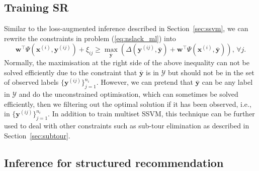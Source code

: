 \subsection{Training SR}
\label{ssec:SRtrain}


Similar to the loss-augmented inference described in Section~\ref{sec:ssvm}, 
we can rewrite the constraints in problem (\ref{eq:nslack_ml}) into
\begin{equation*}
\mathbf{w}^\top \Psi(\mathbf{x}^{(i)}, \mathbf{y}^{(ij)}) + \xi_{ij} \ge 
\max_{\bar{\mathbf{y}}} \left( \Delta(\mathbf{y}^{(ij)}, \bar{\mathbf{y}}) + \mathbf{w}^\top \Psi(\mathbf{x}^{(i)}, \bar{\mathbf{y}}) \right),
\, \forall j.
\end{equation*} 
Normally, the maximisation at the right side of the above inequality can not be solved efficiently due to the constraint that 
$\bar{\mathbf{y}}$ is in $\mathcal{Y}$ but should not be in the set of observed labels $\{\mathbf{y}^{(ij)}\}_{j=1}^{n_i}$.
However, we can pretend that $\bar{\mathbf{y}}$ can be any label in $\mathcal{Y}$ and do the unconstrained optimisation,
which can sometimes be solved efficiently, then we filtering out the optimal solution if it has been observed, 
i.e., in $\{\mathbf{y}^{(ij)}\}_{j=1}^{n_i}$. 
In addition to train multiset SSVM, this technique can be further used to deal with other constraints such as sub-tour elimination 
as described in Section~\ref{sec:subtour}.


\subsection{Inference for structured recommendation}
\label{ssec:SRinf}

